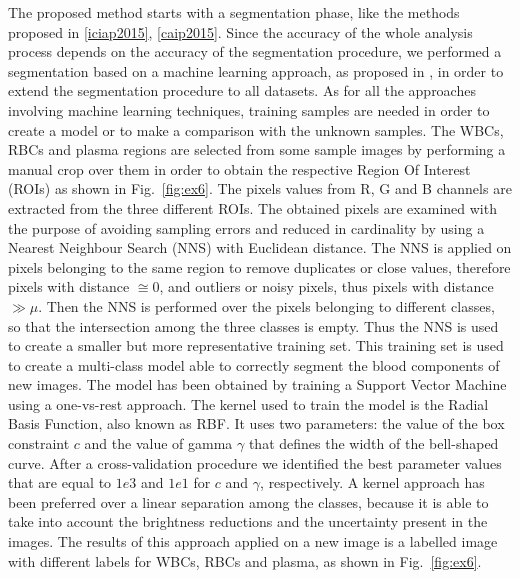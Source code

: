 \documentclass[final,a4paper,12pt,english]{UnicaPhdThesis3}
\begin{document}
The proposed method starts with a segmentation phase, like the methods proposed in \ref{iciap2015}, \ref{caip2015}. Since the accuracy of the whole analysis process depends on the accuracy of the segmentation procedure, we performed a segmentation based on a machine learning approach, as proposed in \cite{DiRuberto2016}, in order to extend the segmentation procedure to all datasets. As for all the approaches involving machine learning techniques, training samples are needed in order to create a model or to make a comparison with the unknown samples. The WBCs, RBCs and plasma regions are selected from some sample images by performing a manual crop over them in order to obtain the respective Region Of Interest (ROIs) as shown in Fig.~\ref{fig:ex6}. The pixels values from R, G and B channels are extracted from the three different ROIs. The obtained pixels are examined with the purpose of avoiding sampling errors and reduced in cardinality by using a Nearest Neighbour Search (NNS) with Euclidean distance. The NNS is applied on pixels belonging to the same region to remove duplicates or close values, therefore pixels with distance $ \cong 0$, and outliers or noisy pixels, thus pixels with distance $ \gg \mu$. Then the NNS is performed over the pixels belonging to different classes, so that the intersection among the three classes is empty. Thus the NNS is used to create a smaller but more representative training set. This training set is used to create a multi-class model able to correctly segment the blood components of new images. The model has been obtained by training a Support Vector Machine using a one-vs-rest approach. The kernel used to train the model is the Radial Basis Function, also known as RBF. It uses two parameters: the value of the box constraint $c$ and the value of gamma $\gamma$ that defines the width of the bell-shaped curve. After a cross-validation procedure we identified the best parameter values that are equal to $1e3$ and $1e1$ for $c$ and $\gamma$, respectively. A kernel approach has been preferred over a linear separation among the classes, because it is able to take into account the brightness reductions and the uncertainty present in the images. The results of this approach applied on a new image is a labelled image with different labels for WBCs, RBCs and plasma, as shown in Fig.~\ref{fig:ex6}. 
\end{document}

